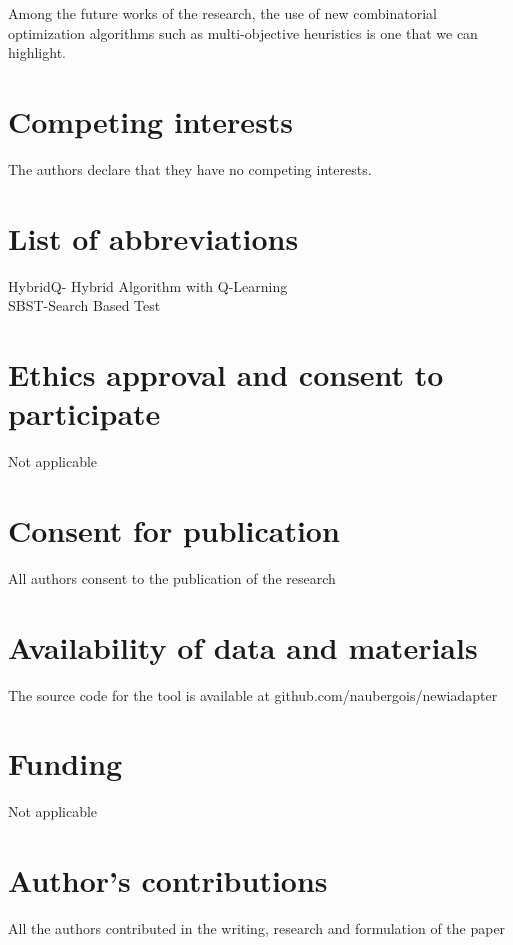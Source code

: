 \documentclass{bmcart}
\begin{document}
Among the future works of the research, the use of new combinatorial optimization algorithms such as multi-objective heuristics is one that we can highlight.








\begin{backmatter}

\section*{Competing interests}
  The authors declare that they have no competing interests.
  
\section*{List of abbreviations}
HybridQ- Hybrid Algorithm with Q-Learning \\
SBST-Search Based Test

\section*{Ethics approval and consent to participate}
Not applicable

\section*{Consent for publication}
All authors consent to the publication of the research

\section*{Availability of data and materials}
The source code for the tool is available at github.com/naubergois/newiadapter

\section*{Funding}
Not applicable

\section*{Author's contributions}
All the authors contributed in the writing, research and formulation of the paper


\end{backmatter}
\end{document}
